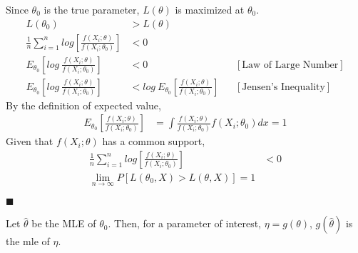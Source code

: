 \documentclass[9pt]{article}
\renewcommand{\qed}{\hfill$\blacksquare$}
\renewenvironment{proof}{\begin{addmargin}[1em]{0em}\begin{newproof}}{\end{newproof}\end{addmargin}\qed}
\newenvironment{theorem}[2][Theorem]{\begin{trivlist}
\item[\hskip \labelsep {\bfseries #1}\hskip \labelsep {\bfseries #2}]}{\end{trivlist}}
\begin{document}
\begin{proof}
Since $\theta_0$ is the true parameter,  $L(\theta)$ is maximized at $\theta_0$.
        \begin{align*}
        L(\theta_0) &> L(\theta)\\
        \frac{1}{n}\sum^n_{i=1}log \left[ \frac{f(X_i;\theta)}{f(X_i;\theta_0)}\right] &< 0\\
        E_{\theta_0}\left[log\ \frac{f(X_i;\theta)}{f(X_i;\theta_0)}\right] &< 0 &&[\text{Law of Large Number}]\\
        E_{\theta_0}\left[log\ \frac{f(X_i;\theta)}{f(X_i;\theta_0)}\right] &< log\ E_{\theta_0}\left[ \frac{f(X_i;\theta)}{f(X_i;\theta_0)}\right] && [\text{Jensen's Inequality}]
    \end{align*}
By the definition of expected value,
\begin{align*}
    E_{\theta_0}\left[\frac{f(X_i;\theta)}{f(X_i;\theta_0)}\right] &= \int \frac{f(X_i;\theta)}{f(X_i;\theta_0)} f(X_i;\theta_0)dx = 1
\end{align*}
Given that $f(X_i;\theta)$ has a common support,
\begin{align*}
    \frac{1}{n}\sum^n_{i=1}log \left[ \frac{f(X_i;\theta)}{f(X_i;\theta_0)}\right] &< 0\\
    \lim_{n\to \infty} P[L(\theta_0, X) > L(\theta, X)] =1
\end{align*}
\end{proof}

\begin{theorem}{MLE of a Function of Parameter}
    Let $\hat \theta$ be the MLE of $\theta_0$. Then, for a parameter of interest, $\eta = g(\theta)$,  $g(\hat\theta)$ is the mle of $\eta$.
\end{theorem}
\end{document}
